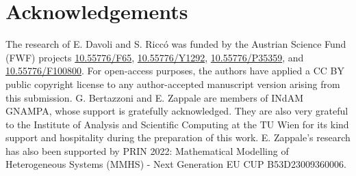 \documentclass[a4paper,11pt,oneside,notitlepage]{article}
\numberwithin{equation}{section}
\begin{document}
\section*{Acknowledgements}

The research of E. Davoli and S. Ricc\'o was funded by the Austrian Science Fund (FWF) projects \href{https://www.doi.org/10.55776/F65}{10.55776/F65}, \href{https://www.doi.org/10.55776/Y1292}{10.55776/Y1292}, \href{https://www.doi.org/10.55776/P35359}{10.55776/P35359}, and \href{https://www.doi.org/10.55776/F100800}{10.55776/F100800}. For open-access purposes, the authors have applied a CC BY public copyright license to any author-accepted manuscript version arising from this submission. G. Bertazzoni and E. Zappale are members of INdAM GNAMPA, whose support is gratefully acknowledged. They are also very grateful to the Institute of Analysis and Scientific Computing at the TU Wien for its kind support and hospitality during the preparation of this work. E. Zappale's research has also been supported by PRIN 2022: Mathematical Modelling of Heterogeneous Systems (MMHS) - Next Generation EU CUP B53D23009360006.

\end{document}

